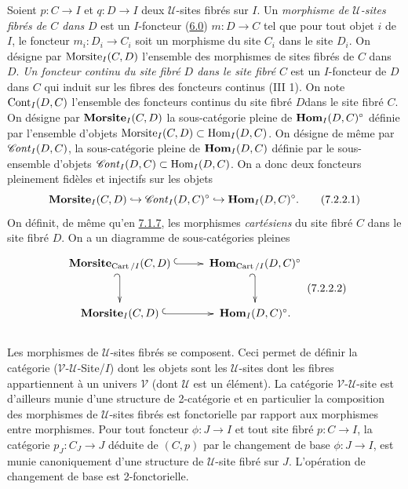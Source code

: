 \documentclass[10pt]{../fichiers-configuration-latex/smfart}
\begin{document}
\subsubsection{}

Soient $p : C \to I$ et $q : D \to I$ deux $𝒰$-sites fibrés sur
$I$. Un \emph{morphisme de $𝒰$-sites fibrés de $C$ dans} $D$ est un
$I$-foncteur (\hyperref[VI.subsec6.0]{6.0}) $m : D \to C$ tel que pour tout objet $i$ de $I$,
le foncteur $m_i : D_i \to C_i$ soit un morphisme du site $C_i$ dans
le site $D_i$. On désigne par $\operatorname{Morsite}_I(C, D)$ l'ensemble des
morphismes de sites fibrés de $C$ dans $D$. \emph{Un foncteur continu
  du site fibré $D$ dans le site fibré} $C$ est un $I$-foncteur de
$D$ dans $C$ qui induit sur les fibres des foncteurs continus (III
1). On note $\operatorname{Cont}_{I}(D, C)$ l'ensemble des foncteurs continus du
site fibré $D$\pageoriginale dans le site fibré $C$. On désigne par
$\operatorname{\mathbf{Morsite}}_I (C, D)$ la sous-catégorie pleine de $\operatorname{\mathbf{Hom}}_I (D,
C)^{\circ}$ définie par l'ensemble d'objets $\operatorname{Morsite}_I (C, D)
\subset \operatorname{Hom}_I (D, C)$. On désigne de même par $\operatorname{\mathscr{C}\!\mathit{ont}}_I(D, C)$, la
sous-catégorie pleine de $\operatorname{\mathbf{Hom}}_I (D, C)$ définie par le
sous-ensemble d'objets $\operatorname{\mathscr{C}\!\mathit{ont}}_I (D, C) \subset \operatorname{Hom}_I (D, C)$. On a
donc deux foncteurs pleinement fidèles et injectifs sur les objets
\begin{equation*}
\operatorname{\mathbf{Morsite}}_I (C, D) \hookrightarrow \operatorname{\mathscr{C}\!\mathit{ont}}_I (D, C)^{\circ} \hookrightarrow
\operatorname{\mathbf{Hom}}_I (D, C)^{\circ}{}.\tag{7.2.2.1}
\end{equation*}
On définit, de même qu'en \hyperref[VI.subsubsec7.1.7]{7.1.7}, les morphismes \emph{cartésiens} du
site fibré $C$ dans le site fibré $D$. On a un diagramme de
sous-catégories pleines
\[\vcenter{
\xymatrix@M=.2cm{
\Mmorsite_{\Cart/I}(C,D)\ar@{^{(}->}[r] \ar@{_{(}->}[d]&
\Hhom_{\Cart/I}(D,C)^{\circ} \ar@{_{(}->}[d]\\
\Mmorsite_I(C,D)\ar@{^{(}->}[r]& \Hhom_I(D,C)^{\circ}.
}}\leqno{(7.2.2.2)}
\]

\subsubsection{}

Les morphismes de $𝒰$-sites fibrés se composent. Ceci permet de
définir la catégorie ($𝒱$-$𝒰$-Site/$I$) dont les
objets sont les $𝒰$-sites
dont les fibres appartiennent à un univers $𝒱$ (dont $𝒰$ est un
élément). La catégorie $𝒱$-$𝒰$-site est d'ailleurs munie d'une
structure de 2-catégorie et en particulier la composition des
morphismes de $𝒰$-sites fibrés est fonctorielle par rapport aux
morphismes entre morphismes. Pour tout foncteur $\phi : J \to I$ et
tout site fibré $p : C \to I$, la catégorie $p_J : C_J \to J$ déduite
de $(C, p)$ par le changement de base $\phi : J \to I$, est munie
canoniquement d'une structure de $𝒰$-site fibré sur $J$. L'opération
de changement de base est 2-fonctorielle.
\end{document}
